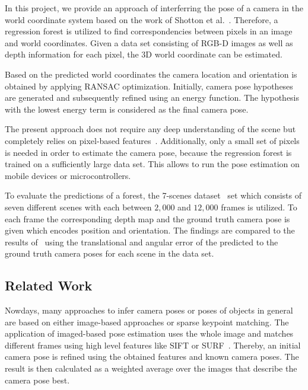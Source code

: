 \documentclass[final]{cvpr}
\begin{document}
In this project, we provide an approach of interferring the pose of a camera in the world coordinate system
based on the work of Shotton et al.~\cite{shotton2013}. Therefore, a regression forest is utilized to find correspondencies
between pixels in an image and world coordinates. Given a data set
consisting of RGB-D images as well as depth information for each pixel, the 3D world coordinate can be estimated.

Based on the predicted world coordinates the camera location and orientation is obtained by applying RANSAC
optimization. Initially, camera pose hypotheses are generated and subsequently refined using an energy function.
The hypothesis with the lowest energy term is considered as the final camera pose. 

The present approach does not require any deep understanding of the scene but completely relies on 
pixel-based features~\cite{shotton2013}. Additionally, only a small set of pixels is needed in order to estimate 
the camera pose, because the regression forest is trained on a sufficiently large data set. This allows to 
run the pose estimation on mobile devices or microcontrollers.

To evaluate the predictions of a forest, the 7-scenes dataset~\cite{glocker2013} set which consists of seven 
different scenes with each between $2,000$ and $12,000$ frames is utilized. To each frame the corresponding 
depth map and the ground truth camera pose is given which encodes position and orientation. The findings are 
compared to the results of~\cite{shotton2013} using the translational and angular error of 
the predicted to the ground truth camera poses for each scene in the data set.


\subsection{Related Work}
Nowdays, many approaches to infer camera poses or poses of objects in general are based on either image-based approaches or 
sparse keypoint matching. The application of imaged-based pose estimation uses the whole image and matches different frames 
using high level features like \ac{SIFT} or \ac{SURF}~\cite{Klein2008}. Thereby, an initial camera pose is refined using 
the obtained features and known camera poses. The result is then calculated as a weighted average over the 
images that describe the camera pose best. 
\end{document}
